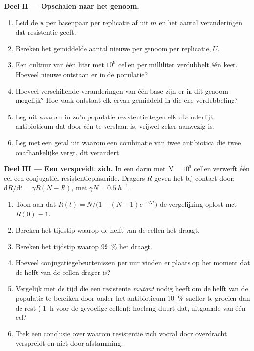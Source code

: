 \begin{problem}
\medskip
\noindent\textbf{Deel II --- Opschalen naar het genoom.}
\begin{enumerate}[resume]
  \item Leid de  $u$ per basenpaar per replicatie af uit
        $m$ en het aantal veranderingen dat resistentie geeft.
  \item Bereken het gemiddelde aantal nieuwe  per genoom per
        replicatie, $U$.
  \item Een cultuur van één liter met $10^{9}$ cellen per milliliter
        verdubbelt één keer. Hoeveel nieuwe  ontstaan er in de
        populatie?
  \item Hoeveel verschillende veranderingen van één base zijn er in dit
        genoom mogelijk? Hoe vaak ontstaat elk ervan gemiddeld in die ene
        verdubbeling?
  \item Leg uit waarom in zo'n populatie resistentie tegen elk afzonderlijk
        antibioticum dat door één  te verslaan is, vrijwel zeker
        aanwezig is.
  \item Leg met een getal uit waarom een combinatie van twee antibiotica
        die twee onafhankelijke  vergt, dit verandert.
\end{enumerate}

\medskip
\noindent\textbf{Deel III --- Een  verspreidt zich.}
In een darm met $N = 10^{9}$ cellen verwerft één cel een conjugatief
resistentieplasmide. Dragers $R$ geven het bij contact door:
$\mathrm{d}R/\mathrm{d}t = \gamma R(N - R)$, met $\gamma N =
\qty{0.5}{h^{-1}}$.
\begin{enumerate}[resume]
  \item Toon aan dat $R(t) = N/\bigl(1 + (N - 1)e^{-\gamma N t}\bigr)$
        de vergelijking oplost met $R(0) = 1$.
  \item Bereken het tijdstip waarop de helft van de cellen het 
        draagt.
  \item Bereken het tijdstip waarop \qty{99}{\%} het draagt.
  \item Hoeveel conjugatiegebeurtenissen per uur vinden er plaats op het
        moment dat de helft van de cellen drager is?
  \item Vergelijk met de tijd die een resistente \emph{mutant} nodig heeft
        om de helft van de populatie te bereiken door onder het
        antibioticum \qty{10}{\%} sneller te groeien dan de rest
        ( \qty{1}{h} voor de gevoelige cellen): hoelang duurt
        dat, uitgaande van één cel?
  \item Trek een conclusie over waarom resistentie zich vooral door
        overdracht verspreidt en niet door afstamming.
\end{enumerate}


\end{problem}
